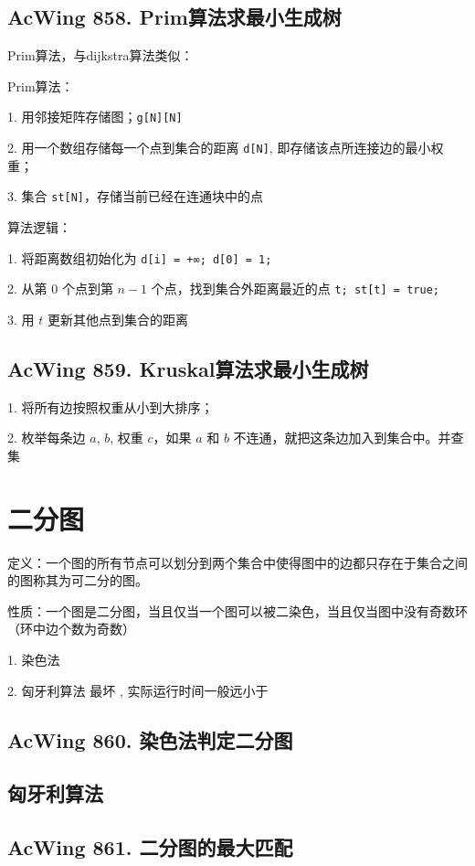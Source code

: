 \subsection{AcWing 858. Prim算法求最小生成树}
Prim算法，与dijkstra算法类似：

Prim算法：

1. 用邻接矩阵存储图；\lstinline{g[N][N]}

2. 用一个数组存储每一个点到集合的距离 \lstinline{d[N]}, 即存储该点所连接边的最小权重；

3. 集合 \lstinline{st[N]}，存储当前已经在连通块中的点

算法逻辑：

1. 将距离数组初始化为 \lstinline{d[i] = +∞; d[0] = 1;}

2. 从第 $0$ 个点到第 $n - 1$ 个点，找到集合外距离最近的点 \lstinline{t; st[t] = true;}

3. 用 $t$ 更新其他点到集合的距离

\subsection{AcWing 859. Kruskal算法求最小生成树}

1. 将所有边按照权重从小到大排序；

2. 枚举每条边 $a$, $b$, 权重 $c$，如果 $a$ 和 $b$ 不连通，就把这条边加入到集合中。并查集

\section{二分图}

定义：一个图的所有节点可以划分到两个集合中使得图中的边都只存在于集合之间的图称其为可二分的图。

性质：一个图是二分图，当且仅当一个图可以被二染色，当且仅当图中没有奇数环（环中边个数为奇数）

1. 染色法 

2. 匈牙利算法 最坏 , 实际运行时间一般远小于 

\subsection{AcWing 860. 染色法判定二分图}

\subsection{匈牙利算法}
\subsection{AcWing 861. 二分图的最大匹配}
